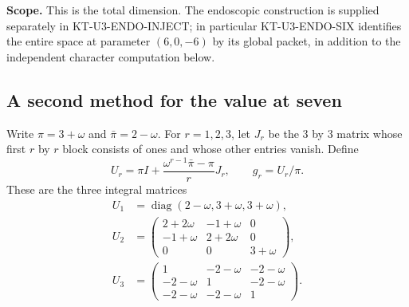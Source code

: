 \documentclass[11pt,a4paper]{article}
\theoremstyle{definition}
\renewcommand{\paragraph}[1]{\par\smallskip\noindent\textbf{#1}\quad\ignorespaces}
\begin{document}
\paragraph{Scope.}
This is the total dimension. The endoscopic construction is supplied
separately in KT-U3-ENDO-INJECT; in particular KT-U3-ENDO-SIX
identifies the entire space at parameter $(6,0,-6)$ by its global
packet, in addition to the independent character computation below.

\subsection{A second method for the value at seven}

Write $\pi=3+\omega$ and $\bar\pi=2-\omega$.
For $r=1,2,3$, let $J_r$ be the $3$ by $3$ matrix whose first
$r$ by $r$ block consists of ones and whose other entries vanish.
Define
\[
 U_r=\pi I+\frac{\omega^{r-1}\bar\pi-\pi}{r}J_r,
 \qquad g_r=U_r/\pi.
\]
These are the three integral matrices
\[
\begin{aligned}
U_1&=\operatorname{diag}(2-\omega,3+\omega,3+\omega),\\[3pt]
U_2&=\begin{pmatrix}2+2\omega&-1+\omega&0\\
-1+\omega&2+2\omega&0\\0&0&3+\omega\end{pmatrix},
\\[3pt]
U_3&=\begin{pmatrix}1&-2-\omega&-2-\omega\\
-2-\omega&1&-2-\omega\\-2-\omega&-2-\omega&1\end{pmatrix}.
\end{aligned}
\]
\end{document}
